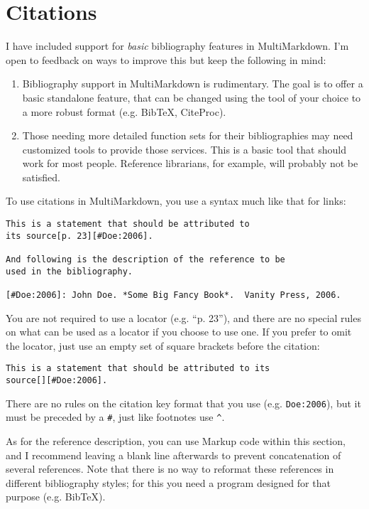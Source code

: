 \section{Citations}
\label{citations}

I have included support for \emph{basic} bibliography features in MultiMarkdown. I'm open to feedback on ways to improve this but keep the following in mind:

\begin{enumerate}
\item Bibliography support in MultiMarkdown is rudimentary. The goal is to offer a basic standalone feature, that can be changed using the tool of your choice to a more robust format (e.g. BibTeX, CiteProc).

\item Those needing more detailed function sets for their bibliographies may need customized tools to provide those services. This is a basic tool that should work for most people. Reference librarians, for example, will probably not be satisfied.

\end{enumerate}

To use citations in MultiMarkdown, you use a syntax much like that for links:

\begin{verbatim}
This is a statement that should be attributed to
its source[p. 23][#Doe:2006].

And following is the description of the reference to be
used in the bibliography.

[#Doe:2006]: John Doe. *Some Big Fancy Book*.  Vanity Press, 2006.
\end{verbatim}

You are not required to use a locator (e.g. ``p. 23''), and there are no special rules on what can be used as a locator if you choose to use one. If you prefer to omit the locator, just use an empty set of square brackets before the citation:

\begin{verbatim}
This is a statement that should be attributed to its 
source[][#Doe:2006].
\end{verbatim}

There are no rules on the citation key format that you use (e.g. \texttt{Doe:2006}), but it must be preceded by a \texttt{\#}, just like footnotes use \texttt{\^{}}.

As for the reference description, you can use Markup code within this section, and I recommend leaving a blank line afterwards to prevent concatenation of several references. Note that there is no way to reformat these references in different bibliography styles; for this you need a program designed for that purpose (e.g. BibTeX).

